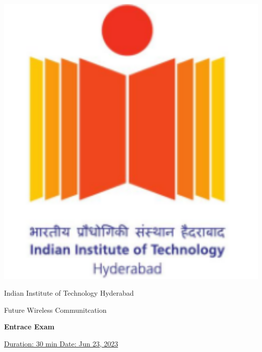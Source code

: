 \documentclass[11pt, a4paper]{exam}
\begin{document}
	\noindent
	\begin{minipage}[l]{0.1\textwidth}
		\noindent
		\includegraphics[width=1.6\textwidth]{figs/logo.png}
	\end{minipage}
\hfill
\begin{minipage}[c]{0.8\textwidth}
	\begin{center}
		\large	Indian Institute of Technology Hyderabad \par
		\large	Future Wireless Communitcation \par
	\large \textbf{Entrace Exam}%
	\end{center}
\end{minipage}
\par
\vspace{0.2in}
\noindent
\uline{Duration: 30 min \hfill Date: Jun 23, 2023}%
\par 
\vspace{0.15in}
\noindent
\centering
\end{document}
